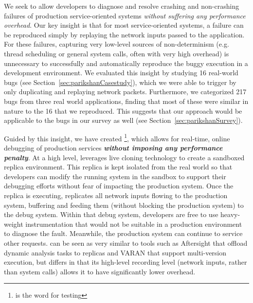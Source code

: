 We seek to allow developers to diagnose and resolve crashing and non-crashing failures of production service-oriented systems \emph{without suffering any performance overhead}.
Our key insight is that for most service-oriented systems, a failure can be reproduced simply by replaying the network inputs passed to the application.
For these failures, capturing very low-level sources of non-determinism (e.g. thread scheduling or general system calls, often with very high overhead) is unnecessary to successfully and automatically reproduce the buggy execution in a development environment.
We evaluated this insight by studying 16 real-world bugs (see Section~\ref{sec:parikshanCasestudy}), which we were able to trigger by only duplicating and replaying network packets.
Furthermore, we categorized 217 bugs from three real world applications, finding that most of these were similar in nature to the 16 that we reproduced. 
This suggests that our approach would be applicable to the bugs in our survey as well (see Section~\ref{sec:parikshanSurvey}).


Guided by this insight, we have created \parikshan\footnote{\parikshan is the \toolNameLang word for  testing}, which allows for real-time, online debugging of production services \textbf{\emph{without imposing any performance penalty}}.
At a high level, \parikshan leverages live cloning technology to create a sandboxed replica environment.
This replica is kept isolated from the real world so that developers can modify the running system in the sandbox to support their debugging efforts without fear of impacting the production system.
Once the replica is executing, \parikshan replicates all network inputs flowing to the production system, buffering and feeding them (without blocking the production system) to the debug system.
Within that debug system, developers are free to use heavy-weight instrumentation that would not be suitable in a production environment to diagnose the fault.
Meanwhile, the production system can continue to service other requests.
\parikshan can be seen as very similar to tools such as Aftersight \cite{aftersight} that offload dynamic analysis tasks to replicas and VARAN \cite{Hosek:2015:VUE:2694344.2694390} that support multi-version execution, but differs in that its high-level recording level (network inputs, rather than system calls) allows it to have significantly lower overhead.


